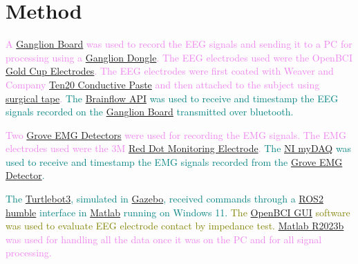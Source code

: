 \section{Method}

\textcolor{violet}{A \href{https://docs.openbci.com/Ganglion/GanglionLanding/}{Ganglion Board} was used to record the EEG signals and sending it to a PC for processing using a \href{https://shop.openbci.com/products/ganglion-dongle}{Ganglion Dongle}.}
\textcolor{violet}{The EEG electrodes used were the OpenBCI \href{https://shop.openbci.com/products/openbci-gold-cup-electrodes}{Gold Cup Electrodes}. The EEG electrodes were first coated with Weaver and Company \href{https://www.weaverandcompany.com/products/ten20/}{Ten20 Conductive Paste} and then attached to the subject using \href{https://www.apotekhjartat.se/product/hjartats-kirurgtejp-brun-25-cm-x-91-m/}{surgical tape}.}
\textcolor{teal}{The \href{https://brainflow.readthedocs.io/en/stable/index.html}{Brainflow API} was used to receive and timestamp the EEG signals recorded on the \href{https://docs.openbci.com/Ganglion/GanglionLanding/}{Ganglion Board} transmitted over bluetooth.}

\textcolor{violet}{Two \href{https://wiki.seeedstudio.com/Grove-EMG_Detector/}{Grove EMG Detectors} were used for recording the EMG signals.}
\textcolor{violet}{The EMG electrodes used were the 3M \href{https://www.3m.com/3M/en_US/p/d/b00037638/}{Red Dot Monitoring Electrode}.}
\textcolor{teal}{The \href{https://www.ni.com/en/shop/engineering-education/portable-student-devices/mydaq/what-is-mydaq.html}{NI myDAQ} was used to receive and timestamp the EMG signals recorded from the \href{https://wiki.seeedstudio.com/Grove-EMG_Detector/}{Grove EMG Detector}.}

\textcolor{teal}{The \href{https://github.com/ROBOTIS-GIT/turtlebot3}{Turtlebot3}, simulated in \href{https://gazebosim.org/home}{Gazebo}, received commands through a \href{https://docs.ros.org/en/humble/index.html}{ROS2 humble} interface in \href{https://se.mathworks.com/products/matlab.html}{Matlab} running on Windows 11.}
\textcolor{olive}{The \href{https://docs.openbci.com/Software/OpenBCISoftware/GUIDocs/}{OpenBCI GUI} software was used to evaluate EEG electrode contact by impedance test.}
\textcolor{violet}{\href{https://se.mathworks.com/products/matlab.html}{Matlab R2023b} was used for handling all the data once it was on the PC and for all signal processing.}

